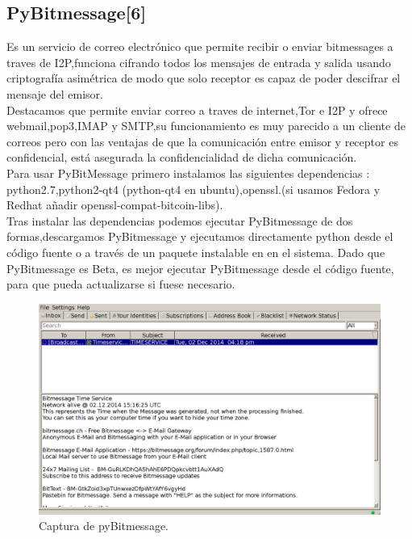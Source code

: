\documentclass{article}
\begin{document}
\subsection{PyBitmessage[6]}
Es un servicio de correo electrónico que permite recibir o enviar bitmessages a traves de I2P,funciona cifrando todos los mensajes de entrada y salida
usando criptografía asimétrica de modo que solo receptor es capaz de poder descifrar el mensaje del emisor.
\\

Destacamos que permite enviar correo a traves de internet,Tor e I2P y ofrece webmail,pop3,IMAP y SMTP,su funcionamiento es muy parecido a un cliente de correos
pero con las ventajas de que la comunicación entre  emisor y receptor es confidencial, está asegurada la confidencialidad de dicha comunicación.  
\\

Para usar PyBitMessage  primero instalamos las siguientes dependencias : python2.7,python2-qt4 (python-qt4 en ubuntu),openssl.(si usamos  Fedora y Redhat añadir openssl-compat-bitcoin-libs).
\\

Tras instalar las dependencias podemos ejecutar PyBitmessage de dos formas,descargamos PyBitmessage y ejecutamos directamente python desde el código fuente o a través de un paquete 
instalable en en el sistema. Dado que PyBitmessage es Beta, es mejor  ejecutar PyBitmessage desde el código fuente, para que pueda actualizarse si fuese necesario.
\\

\begin{figure}
    \includegraphics[]{media/PyBitMessage-client.png}
    \caption{Captura de pyBitmessage.}
    \label{fig5}
\end{figure}
\end{document}
